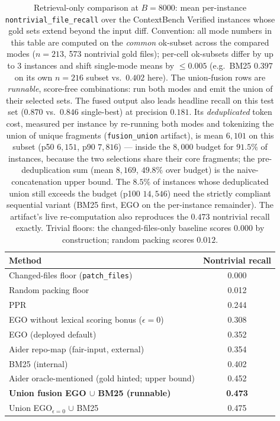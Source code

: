 \documentclass[11pt, a4paper]{article}
\begin{document}
\begin{table}[h]
\centering
\small
\caption{Retrieval-only comparison at $B{=}8000$: mean per-instance \texttt{nontrivial\_file\_recall} over the ContextBench Verified instances whose gold sets extend beyond the input diff. Convention: all mode numbers in this table are computed on the \emph{common} ok-subset across the compared modes ($n{=}213$, 573 nontrivial gold files); per-cell ok-subsets differ by up to 3 instances and shift single-mode means by $\leq 0.005$ (e.g.\ BM25 $0.397$ on its own $n{=}216$ subset vs.\ $0.402$ here). The union-fusion rows are \emph{runnable}, score-free combinations: run both modes and emit the union of their selected sets. The fused output also leads headline recall on this test set ($0.870$ vs.\ $0.846$ single-best) at precision $0.181$. Its \emph{deduplicated} token cost, measured per instance by re-running both modes and tokenizing the union of unique fragments (\texttt{fusion\_union} artifact), is mean $6{,}101$ on this subset (p50 $6{,}151$, p90 $7{,}816$) --- inside the $8{,}000$ budget for $91.5\%$ of instances, because the two selections share their core fragments; the pre-deduplication sum (mean $8{,}169$, $49.8\%$ over budget) is the naive-concatenation upper bound. The $8.5\%$ of instances whose deduplicated union still exceeds the budget (p100 $14{,}546$) need the strictly compliant sequential variant (BM25 first, EGO on the per-instance remainder). The artifact's live re-computation also reproduces the $0.473$ nontrivial recall exactly. Trivial floors: the changed-files-only baseline scores $0.000$ by construction; random packing scores $0.012$.}
\label{tab:nontrivial}
\begin{tabular}{lc}
\toprule
\textbf{Method} & \textbf{Nontrivial recall} \\
\midrule
Changed-files floor (\texttt{patch\_files}) & 0.000 \\
Random packing floor                        & 0.012 \\
PPR                                         & 0.244 \\
EGO without lexical scoring bonus ($\epsilon{=}0$) & 0.308 \\
EGO (deployed default)                      & 0.352 \\
Aider repo-map (fair-input, external)       & 0.354 \\
BM25 (internal)                             & 0.402 \\
Aider oracle-mentioned (gold hinted; upper bound) & 0.452 \\
\midrule
\textbf{Union fusion EGO $\cup$ BM25 (runnable)} & \textbf{0.473} \\
Union EGO$_{\epsilon=0}$ $\cup$ BM25            & 0.475 \\
\bottomrule
\end{tabular}
\end{table}
\end{document}
